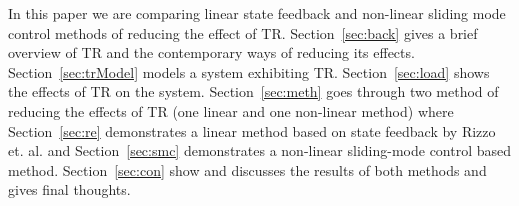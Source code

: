 In this paper we are comparing linear state feedback and non-linear sliding mode control methods of reducing the effect of TR.
Section~\ref{sec:back} gives a brief overview of TR and the contemporary ways of reducing its effects.
Section~\ref{sec:trModel} models a system exhibiting TR. 
Section~\ref{sec:load} shows the effects of TR on the system.
Section~\ref{sec:meth} goes through two method of reducing the effects of TR (one linear and one non-linear method) where
Section~\ref{sec:re} demonstrates a linear method based on state feedback by Rizzo et. al. and
Section~\ref{sec:smc} demonstrates a non-linear sliding-mode control based method.
Section~\ref{sec:con} show and discusses the results of both methods and gives final thoughts.


